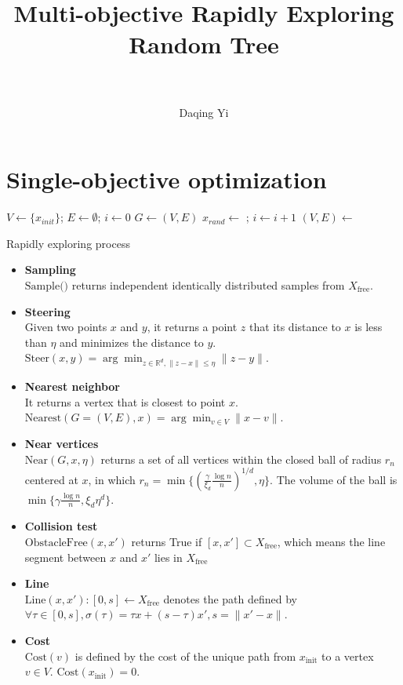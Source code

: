 \documentclass[paper=a4, fontsize=11pt]{scrartcl}
\title{
		\normalfont
		\horrule{0.5pt} \\[0.4cm]
		\huge Multi-objective Rapidly Exploring Random Tree \\
		\horrule{2pt} \\[0.5cm]
}
\author{
		\normalfont %
        Daqing Yi \\
}
\begin{document}
\maketitle

\section{Single-objective optimization}

\begin{algorithm}
\begin{algorithmic}[1]
\State $ V \leftarrow \{ x_{init} \} $; $ E \leftarrow \emptyset $; $ i \leftarrow 0 $
\State $ G \leftarrow (V, E) $
\State $ x_{rand} \leftarrow $  ; $ i \leftarrow i + 1 $
\State $ (V, E) \leftarrow $ 
\EndWhile
\end{algorithmic}
\label{alg:rapidly_exploring_process}
\caption{Rapidly exploring process}
\end{algorithm}

\begin{itemize}
\item \textbf{Sampling} \\
$ \mbox{Sample(}) $ returns independent identically distributed samples from $ X_{\mbox{free}} $.
\item \textbf{Steering} \\
Given two points $ x $ and $ y $, it returns a point $ z $ that its distance to $ x $ is less than $ \eta $ and minimizes the distance to $ y $. 
$ \mbox{Steer}(x,y) = \arg \min_{ z \in \mathbb{R}^{d}, \lVert z -x \rVert \leq \eta } \lVert z - y \rVert $.
\item \textbf{Nearest neighbor} \\
It returns a vertex that is closest to point $ x $.
$ \mbox{Nearest}(G = (V,E), x) = \arg \min_{v \in V} \lVert x - v \rVert $.
\item \textbf{Near vertices} \\
$ \mbox{Near}(G, x, \eta) $ returns a set of all vertices within the closed ball of radius $ r_{n} $ centered at $ x $, in which $ r_{n} = \min \{ ( \frac{\gamma}{\xi_{d}} \frac{\log n}{n} )^{1/d}  , \eta \} $.
The volume of the ball is $ \min \{ \gamma \frac{\log n}{n} , \xi_{d} \eta^{d} \} $.
\item \textbf{Collision test} \\
$ \mbox{ObstacleFree}(x, x') $ returns True if $ [ x, x' ] \subset X_{ \mbox{free} } $, which means the line segment between $ x $ and $ x' $ lies in $ X _{ \mbox{free} } $
\item \textbf{Line} \\
$ \mbox{Line}(x, x') : [0, s] \leftarrow X_{ \mbox{free} } $ denotes the path defined by $ \forall \tau \in [0, s], \sigma( \tau ) = \tau x + (s - \tau) x', s = \lVert x' -x \rVert $.
\item \textbf{Cost} \\
$ \mbox{Cost}( v ) $ is defined by the cost of the unique path from $ x_{ \mbox{init} } $ to a vertex $ v \in V $.
$ \mbox{Cost}( x_{ \mbox{init} } ) = 0 $.
\end{itemize}
\end{document}
